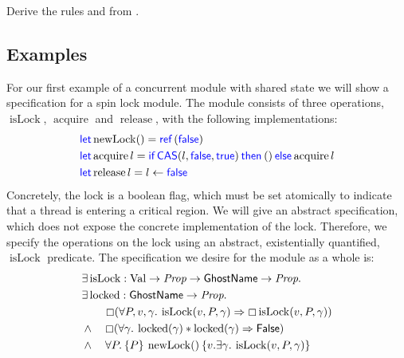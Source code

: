 \begin{exercise}
  Derive the rules  and  from .
\end{exercise}



\subsection{Examples}
\label{sec:examples-basic-concurrency}


\newcommand{\isLock}{\operatorname{isLock}}
\newcommand{\locked}{\operatorname{locked}}
\newcommand{\newLock}{\operatorname{newLock}}
\newcommand{\acquire}{\operatorname{acquire}}
\newcommand{\release}{\operatorname{release}}
\newcommand{\key}{\textsc{K}}

\begin{example}
  \label{ex:basic-spin-lock}
  For our first example of a concurrent module with shared state we will show a specification for a spin lock module.
  The module
  consists of three operations, $\isLock$, $\acquire$ and $\release$,
  with the following implementations:
  \begin{align*}
    &\langkw{let} \newLock () = \Ref(\False)\\
    &\langkw{let} \acquire l = \If{\CAS(l, \False,\True) }then{()}\Else{\acquire l}\\
    &\langkw{let} \release l = l \gets \False
  \end{align*}
  Concretely, the lock is a boolean flag, which must be set atomically
  to indicate that a thread is entering a critical region.  We will
  give an abstract specification, which does not expose the concrete
  implementation of  the lock. Therefore, we specify
  the operations on the lock using
  an abstract, \ie{} existentially quantified, $\isLock$ predicate.
  The specification we desire for the module as a whole is:
  \begin{align*}
    &\Exists \isLock : \Val \to \Prop \to \textlog{GhostName} \to \Prop.\nonumber\\
    &\Exists \locked : \textlog{GhostName} \to \Prop.\nonumber\\
    &\quad\quad\persistently(\All P, v, \gamma. \isLock(v,P,\gamma) \implies \persistently \isLock(v,P,\gamma))\\
    &\land\quad\persistently(\All \gamma. \locked(\gamma) \ast \locked(\gamma) \implies \FALSE)\\
    &\land\quad\All P.\hoare{P}{\newLock ()}{v.\Exists \gamma.\isLock(v,P,\gamma)}\\

\end{align*}
\end{example}
